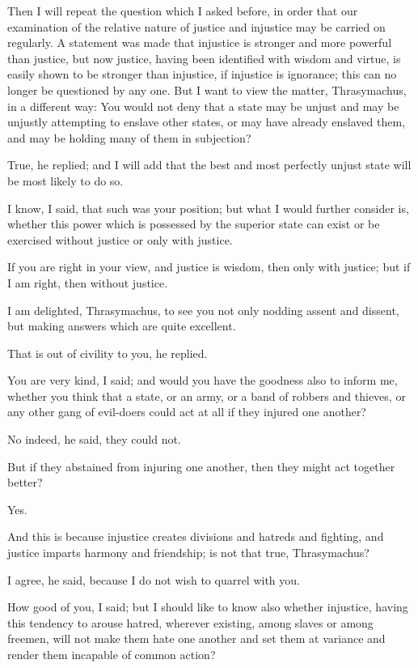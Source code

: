 Then I will repeat the question which I asked before, in order that
our examination of the relative nature of justice and injustice may be
carried on regularly. A statement was made that injustice is stronger
and more powerful than justice, but now justice, having been identified
with wisdom and virtue, is easily shown to be stronger than injustice,
if injustice is ignorance; this can no longer be questioned by any one.
But I want to view the matter, Thrasymachus, in a different way: You
would not deny that a state may be unjust and may be unjustly attempting
to enslave other states, or may have already enslaved them, and may be
holding many of them in subjection?

True, he replied; and I will add that the best and most perfectly unjust
state will be most likely to do so.

I know, I said, that such was your position; but what I would further
consider is, whether this power which is possessed by the superior state
can exist or be exercised without justice or only with justice.

If you are right in your view, and justice is wisdom, then only with
justice; but if I am right, then without justice.

I am delighted, Thrasymachus, to see you not only nodding assent and
dissent, but making answers which are quite excellent.

That is out of civility to you, he replied.

You are very kind, I said; and would you have the goodness also to
inform me, whether you think that a state, or an army, or a band of
robbers and thieves, or any other gang of evil-doers could act at all if
they injured one another?

No indeed, he said, they could not.

But if they abstained from injuring one another, then they might act
together better?

Yes.

And this is because injustice creates divisions and hatreds and
fighting, and justice imparts harmony and friendship; is not that true,
Thrasymachus?

I agree, he said, because I do not wish to quarrel with you.

How good of you, I said; but I should like to know also whether
injustice, having this tendency to arouse hatred, wherever existing,
among slaves or among freemen, will not make them hate one another and
set them at variance and render them incapable of common action?

